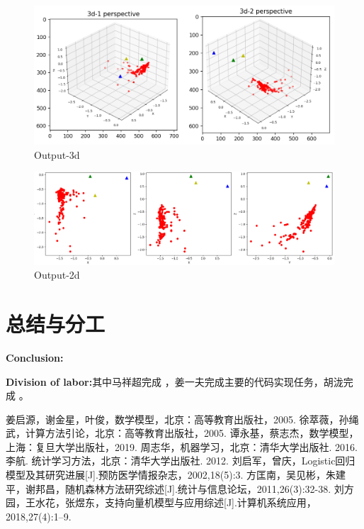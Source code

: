 \documentclass{article}
\numberwithin{equation}{section}						%
\numberwithin{figure}{section}							%
\begin{document}
\begin{sloppypar}
	\begin{figure}[H]
		\centering
		\includegraphics[width=0.8\linewidth]{3d-3.png}
		\caption{Output-3d}
	\end{figure}

	\begin{figure}[H]
		\centering
		\includegraphics[width=0.8\linewidth]{2d.png}
		\caption{Output-2d}
	\end{figure}


	\section{总结与分工}

\textbf{Conclusion:}

\textbf{Division of labor:}其中马祥超完成  ，姜一夫完成主要的代码实现任务，胡泷完成   。


	
\end{sloppypar}
	\begin{thebibliography}{99}
		 姜启源，谢金星，叶俊，数学模型，北京：高等教育出版社，2005.
		 徐萃薇，孙绳武，计算方法引论，北京：高等教育出版社，2005.
		 谭永基，蔡志杰，数学模型，上海：复旦大学出版社，2019.
		 周志华，机器学习，北京：清华大学出版社. 2016.
		 李航. 统计学习方法，北京：清华大学出版社. 2012.
		 刘启军，曾庆，Logistic回归模型及其研究进展[J].预防医学情报杂志，2002,18(5):3.
		 方匡南，吴见彬，朱建平，谢邦昌，随机森林方法研究综述[J].统计与信息论坛，2011,26(3):32-38.
		 刘方园，王水花，张煜东，支持向量机模型与应用综述[J].计算机系统应用，2018,27(4):1–9.
	\end{thebibliography}
\end{document}
